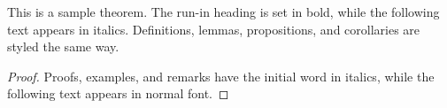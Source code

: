\documentclass[runningheads]{llncs}
\begin{document}
\begin{theorem}
This is a sample theorem. The run-in heading is set in bold, while
the following text appears in italics. Definitions, lemmas,
propositions, and corollaries are styled the same way.
\end{theorem}
%
%
\begin{proof}
Proofs, examples, and remarks have the initial word in italics,
while the following text appears in normal font.
\end{proof}
%
%
%
% 
% 
%
\begin{thebibliography}{8}




\end{thebibliography}
\end{document}

